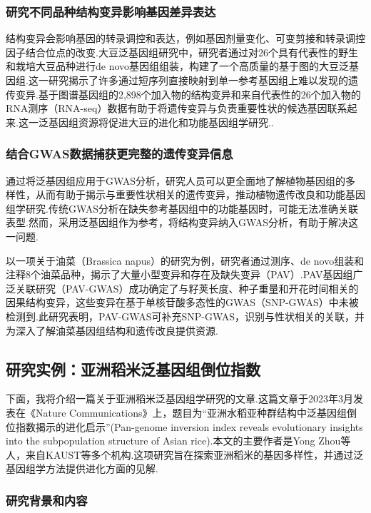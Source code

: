 \subsubsection{研究不同品种结构变异影响基因差异表达}

结构变异会影响基因的转录调控和表达，例如基因剂量变化、可变剪接和转录调控因子结合位点的改变.大豆泛基因组研究中，研究者通过对26个具有代表性的野生和栽培大豆品种进行de novo基因组组装，构建了一个高质量的基于图的大豆泛基因组.这一研究揭示了许多通过短序列直接映射到单一参考基因组上难以发现的遗传变异.基于图谱基因组的2,898个加入物的结构变异和来自代表性的26个加入物的RNA测序（RNA-seq）数据有助于将遗传变异与负责重要性状的候选基因联系起来.这一泛基因组资源将促进大豆的进化和功能基因组学研究.\cite{liu2020pan}.

\subsubsection{结合GWAS数据捕获更完整的遗传变异信息}

通过将泛基因组应用于GWAS分析，研究人员可以更全面地了解植物基因组的多样性，从而有助于揭示与重要性状相关的遗传变异，推动植物遗传改良和功能基因组学研究.传统GWAS分析在缺失参考基因组中的功能基因时，可能无法准确关联表型.然而，采用泛基因组作为参考，将结构变异纳入GWAS分析，有助于解决这一问题.

以一项关于油菜（Brassica napus）的研究\cite{song2020eight}为例，研究者通过测序、de novo组装和注释8个油菜品种，揭示了大量小型变异和存在及缺失变异（PAV）.PAV基因组广泛关联研究（PAV-GWAS）成功确定了与籽荚长度、种子重量和开花时间相关的因果结构变异，这些变异在基于单核苷酸多态性的GWAS（SNP-GWAS）中未被检测到.此研究表明，PAV-GWAS可补充SNP-GWAS，识别与性状相关的关联，并为深入了解油菜基因组结构和遗传改良提供资源.

\subsection{研究实例：亚洲稻米泛基因组倒位指数}
下面，我将介绍一篇关于亚洲稻米泛基因组学研究的文章.这篇文章于2023年3月发表在《Nature Communications》上，题目为“亚洲水稻亚种群结构中泛基因组倒位指数揭示的进化启示”(Pan-genome inversion index reveals evolutionary insights into the subpopulation structure of Asian rice)\cite{zhou2023pan}.本文的主要作者是Yong Zhou等人，来自KAUST等多个机构.这项研究旨在探索亚洲稻米的基因多样性，并通过泛基因组学方法提供进化方面的见解.

\subsubsection{研究背景和内容}

